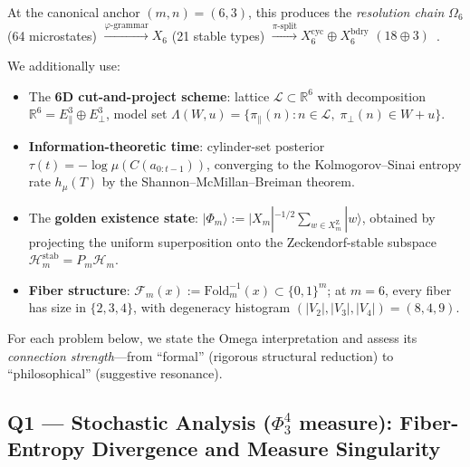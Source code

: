 \noindent
At the canonical anchor $(m,n)=(6,3)$, this produces the
\emph{resolution chain}
$\Omega_6$ (64 microstates)
$\xrightarrow{\varphi\text{-grammar}} X_6$ (21 stable types)
$\xrightarrow{\pi\text{-split}} X_6^{\mathrm{cyc}}\oplus X_6^{\mathrm{bdry}}$
$(18\oplus 3)$~\cite{omega-grg}.

\medskip
We additionally use:
\begin{itemize}[nosep]
\item The \textbf{6D cut-and-project scheme}:
  lattice $\mathcal L\subset\mathbb R^6$
  with decomposition $\mathbb R^6=E_\parallel^3\oplus E_\perp^3$,
  model set
  $\Lambda(W,u)=\{\pi_\parallel(n):n\in\mathcal L,\;\pi_\perp(n)\in W+u\}$.
\item \textbf{Information-theoretic time}:
  cylinder-set posterior $\tau(t)=-\log\mu(C(a_{0:t-1}))$,
  converging to the Kolmogorov--Sinai entropy rate
  $h_\mu(T)$ by the Shannon--McMillan--Breiman theorem.
\item The \textbf{golden existence state}:
  $|\Phi_m\rangle:=|X_m|^{-1/2}\sum_{w\in X_m^{\mathrm Z}}|w\rangle$,
  obtained by projecting the uniform superposition
  onto the Zeckendorf-stable subspace $\mathcal H_m^{\mathrm{stab}}=P_m\mathcal H_m$.
\item \textbf{Fiber structure}:
  $\mathcal F_m(x):=\mathrm{Fold}_m^{-1}(x)\subset\{0,1\}^m$;
  at $m=6$, every fiber has size in $\{2,3,4\}$,
  with degeneracy histogram $(|V_2|,|V_3|,|V_4|)=(8,4,9)$.
\end{itemize}

For each problem below, we state the Omega interpretation and
assess its \emph{connection strength}---from ``formal'' (rigorous
structural reduction) to ``philosophical'' (suggestive resonance).


\subsection{Q1 --- Stochastic Analysis ($\Phi^4_3$ measure):
  Fiber-Entropy Divergence and Measure Singularity}
\label{ss:omega-q1}

